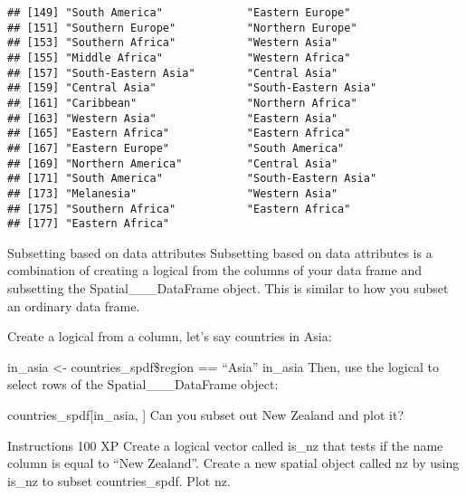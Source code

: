 \documentclass[]{article}
\newenvironment{Shaded}{\begin{snugshade}}{\end{snugshade}}
\newcommand{\CommentTok}[1]{\textcolor[rgb]{0.56,0.35,0.01}{\textit{#1}}}
\newcommand{\KeywordTok}[1]{\textcolor[rgb]{0.13,0.29,0.53}{\textbf{#1}}}
\newcommand{\NormalTok}[1]{#1}
\newcommand{\OperatorTok}[1]{\textcolor[rgb]{0.81,0.36,0.00}{\textbf{#1}}}
\newcommand{\StringTok}[1]{\textcolor[rgb]{0.31,0.60,0.02}{#1}}
\begin{document}
\begin{verbatim}
## [149] "South America"             "Eastern Europe"           
## [151] "Southern Europe"           "Northern Europe"          
## [153] "Southern Africa"           "Western Asia"             
## [155] "Middle Africa"             "Western Africa"           
## [157] "South-Eastern Asia"        "Central Asia"             
## [159] "Central Asia"              "South-Eastern Asia"       
## [161] "Caribbean"                 "Northern Africa"          
## [163] "Western Asia"              "Eastern Asia"             
## [165] "Eastern Africa"            "Eastern Africa"           
## [167] "Eastern Europe"            "South America"            
## [169] "Northern America"          "Central Asia"             
## [171] "South America"             "South-Eastern Asia"       
## [173] "Melanesia"                 "Western Asia"             
## [175] "Southern Africa"           "Eastern Africa"           
## [177] "Eastern Africa"
\end{verbatim}

Subsetting based on data attributes Subsetting based on data attributes
is a combination of creating a logical from the columns of your data
frame and subsetting the Spatial\_\_\_DataFrame object. This is similar
to how you subset an ordinary data frame.

Create a logical from a column, let's say countries in Asia:

in\_asia \textless- countries\_spdf\$region == ``Asia'' in\_asia Then,
use the logical to select rows of the Spatial\_\_\_DataFrame object:

countries\_spdf{[}in\_asia, {]} Can you subset out New Zealand and plot
it?

Instructions 100 XP Create a logical vector called is\_nz that tests if
the name column is equal to ``New Zealand''. Create a new spatial object
called nz by using is\_nz to subset countries\_spdf. Plot nz.

\begin{Shaded}
\end{Shaded}
\end{document}
